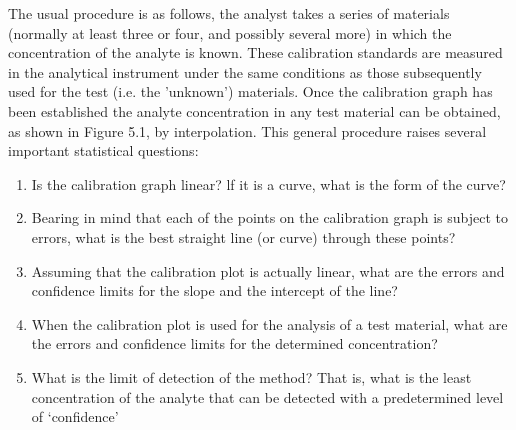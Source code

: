The usual procedure is as follows, the analyst takes a series of materials (normally at least three or four, and possibly several more) in which the concentration of the analyte is known. These calibration standards are measured in the analytical instrument under the same conditions as those subsequently used for the test (i.e. the 'unknown’) materials.
Once the calibration graph has been established the analyte concentration in any test material can be obtained, as shown in Figure 5.1, by interpolation.
This general procedure raises several important statistical questions:

\begin{enumerate}
\item Is the calibration graph linear? lf it is a curve, what is the form of the curve?
\item Bearing in mind that each of the points on the calibration graph is subject to errors, what is the best straight line (or curve) through these points?
\item Assuming that the calibration plot is actually linear, what are the errors and confidence limits for the slope and the intercept of the line?
\item When the calibration plot is used for the analysis of a test material, what are the errors and confidence limits for the determined concentration?
\item What is the limit of detection of the method? That is, what is the least concentration of the analyte that can be detected with a predetermined level of ‘confidence’
\end{enumerate}



